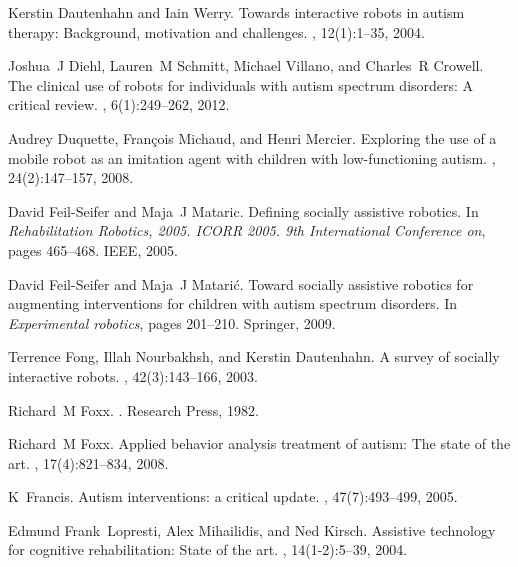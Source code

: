 \documentclass{ut-thesis}
\begin{document}
\begin{thebibliography}{100}
Kerstin Dautenhahn and Iain Werry.
\newblock Towards interactive robots in autism therapy: Background, motivation
  and challenges.
, 12(1):1--35, 2004.

Joshua~J Diehl, Lauren~M Schmitt, Michael Villano, and Charles~R Crowell.
\newblock The clinical use of robots for individuals with autism spectrum
  disorders: A critical review.
, 6(1):249--262, 2012.

Audrey Duquette, Fran{\c{c}}ois Michaud, and Henri Mercier.
\newblock Exploring the use of a mobile robot as an imitation agent with
  children with low-functioning autism.
, 24(2):147--157, 2008.

David Feil-Seifer and Maja~J Mataric.
\newblock Defining socially assistive robotics.
\newblock In {\em Rehabilitation Robotics, 2005. ICORR 2005. 9th International
  Conference on}, pages 465--468. IEEE, 2005.

David Feil-Seifer and Maja~J Matari{\'c}.
\newblock Toward socially assistive robotics for augmenting interventions for
  children with autism spectrum disorders.
\newblock In {\em Experimental robotics}, pages 201--210. Springer, 2009.

Terrence Fong, Illah Nourbakhsh, and Kerstin Dautenhahn.
\newblock A survey of socially interactive robots.
, 42(3):143--166, 2003.

Richard~M Foxx.
.
\newblock Research Press, 1982.

Richard~M Foxx.
\newblock Applied behavior analysis treatment of autism: The state of the art.
,
  17(4):821--834, 2008.

K~Francis.
\newblock Autism interventions: a critical update.
, 47(7):493--499,
  2005.

Edmund Frank~Lopresti, Alex Mihailidis, and Ned Kirsch.
\newblock Assistive technology for cognitive rehabilitation: State of the art.
, 14(1-2):5--39, 2004.


\end{thebibliography}
\end{document}
